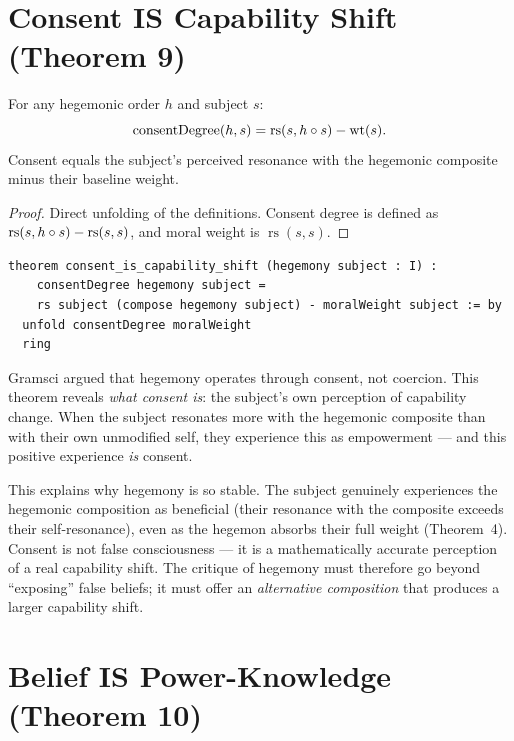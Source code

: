 \section{Consent IS Capability Shift (Theorem 9)}

\begin{theorem}
\label{thm:consent-capability}
For any hegemonic order $h$ and subject $s$:
\[
\text{consentDegree}(h, s) = \operatorname{rs}(s, h \circ s) - \operatorname{wt}(s).
\]
Consent equals the subject's perceived resonance with the hegemonic composite minus their baseline weight.
\end{theorem}

\begin{proof}
Direct unfolding of the definitions.  Consent degree is defined as $\operatorname{rs}(s, h \circ s) - \operatorname{rs}(s, s)$, and moral weight is $\operatorname{rs}(s, s)$.
\end{proof}

\begin{lstlisting}
theorem consent_is_capability_shift (hegemony subject : I) :
    consentDegree hegemony subject =
    rs subject (compose hegemony subject) - moralWeight subject := by
  unfold consentDegree moralWeight
  ring
\end{lstlisting}

\begin{interpretation}
Gramsci argued that hegemony operates through consent, not coercion.  This theorem reveals \emph{what consent is}: the subject's own perception of capability change.  When the subject resonates more with the hegemonic composite than with their own unmodified self, they experience this as empowerment --- and this positive experience \emph{is} consent.

This explains why hegemony is so stable.  The subject genuinely experiences the hegemonic composition as beneficial (their resonance with the composite exceeds their self-resonance), even as the hegemon absorbs their full weight (Theorem~4).  Consent is not false consciousness --- it is a mathematically accurate perception of a real capability shift.  The critique of hegemony must therefore go beyond ``exposing'' false beliefs; it must offer an \emph{alternative composition} that produces a larger capability shift.
\end{interpretation}


\section{Belief IS Power-Knowledge (Theorem 10)}

